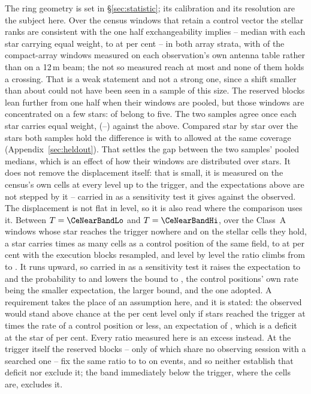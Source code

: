The ring geometry is set in \S\ref{sec:statistic}; its calibration and its
resolution are the subject here. Over the \VerNTested{} census windows that
retain a control vector the stellar ranks are consistent with the one half
exchangeability implies -- median \BkRankBalSurv{} with each star carrying
equal weight, \BkRankBalSurvLo{} to \BkRankBalSurvHi{} at \CeCovPct{} per
cent -- in both array
strata, with \FrNAcaOwn{} of the \FrNAcaRow{} compact-array windows measured
on each observation's own antenna table rather than on a 12\,m beam; the
\FrNAcaOther{} not so measured reach \FrAcaMaxT{} at most and none of them
holds a crossing. That is a weak statement and not a strong
one, since a shift smaller than about \VerKsPowerAca{} could not have been
seen in a sample of this size. The reserved blocks lean further from one half
when their windows are pooled, but those windows are concentrated on a few
stars: \BkRankTopFiveWin{} of \HoWin{} belong to five. The two
samples agree once each star carries equal weight, \BkRankBalHo{}
(\BkRankBalHoLo--\BkRankBalHoHi) against the \BkRankBalSurv{} above.
Compared star by star over the \BkRankPairedStars{} stars both samples hold
the difference is \BkRankPaired{} with \BkRankPairedLo{} to
\BkRankPairedHi{} allowed at the same coverage
(Appendix~\ref{sec:heldout}). That settles the gap between the two samples' pooled medians, which is an effect of how
their windows are distributed over stars. It does not remove the displacement
itself: that is small, it is measured on the census's own cells at every level
up to the trigger, and the expectations above are not stepped by it -- carried
in as a sensitivity test it gives \CeExpX{} against the \CeObs{} observed.
The displacement is not flat in level, so it is also read where the comparison
uses it. Between $T=\CeNearBandLo$ and $T=\CeNearBandHi$, over the
\CeNearNWin{} Class~A windows whose star reaches the trigger nowhere and on
the \CeNearNStar{} stellar cells they hold, a star carries \CeNear{} times as
many cells as a control position of the same field, \CeNearIntLo{} to
\CeNearIntHi{} at \CeCovPct{} per cent with the execution blocks resampled,
and level by level the ratio climbs from \CeNearRiseLo{} to \CeNearRiseHi{}.
It runs upward, so carried in as a sensitivity test it raises the expectation
to \CeExpNear{} and the probability to \CeProbNear{} and lowers the bound to
\CeAddLimNear, the control positions' own rate being the smaller expectation,
the larger bound, and the one adopted. A requirement takes the place of an
assumption here, and it is stated: the \CeObs{} observed
would stand above chance at the \CeAlphaPct{} per cent level only if stars
reached the trigger at \CeRCrit{} times the rate of a control position or
less, an expectation of \CeRCritExp{}, which is a deficit at the star of
\CeRCritPct{} per cent. Every ratio measured here is an excess instead. At
the trigger itself the reserved blocks -- only \HsIndBlocks{} of which share
no observing session with a searched one -- fix the same ratio to \StHoLo{}
to \StHoHi{} on \StHoObs{} events, and so neither establish that deficit
nor exclude it; the band immediately below the trigger,
where the cells are, excludes it.

